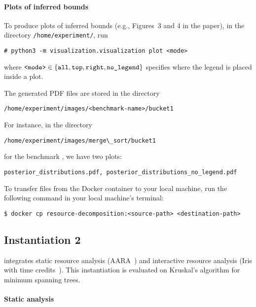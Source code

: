 \paragraph{Plots of inferred bounds}

To produce plots of inferred bounds (e.g., Figures~3 and 4 in the paper), in the
directory \texttt{/home/experiment/}, run
\begin{verbatim}
# python3 -m visualization.visualization plot <mode>
\end{verbatim}
where $\texttt{<mode>} \in \{ {\texttt{all}, \texttt{top}, \texttt{right},
    \texttt{no\_legend}} \}$ specifies where the legend is placed inside a plot.

The generated PDF files are stored in the directory
\begin{verbatim}
/home/experiment/images/<benchmark-name>/bucket1
\end{verbatim}
%
For instance, in the directory
\begin{verbatim}
/home/experiment/images/merge\_sort/bucket1
\end{verbatim}
for the benchmark \mergesort{}, we have two plots:
\begin{verbatim}
posterior_distributions.pdf, posterior_distributions_no_legend.pdf
\end{verbatim}

To transfer files from the Docker container to your local machine, run the
following command in your local machine's terminal:
\begin{verbatim}
$ docker cp resource-decomposition:<source-path> <destination-path>
\end{verbatim}

\subsection{Instantiation 2}
\label{sec:step-by-step-instructions:instantiation-2}

 integrates static resource analysis
(AARA~\citep{Hofmann2003,Hoffmann2011a,Hoffmann2022}) and interactive resource
analysis (Iris with time credits~\citep{Chargueraud2019}).
%
This instantiation is evaluated on Kruskal's algorithm for minimum spanning
trees.

\paragraph{Static analysis}

